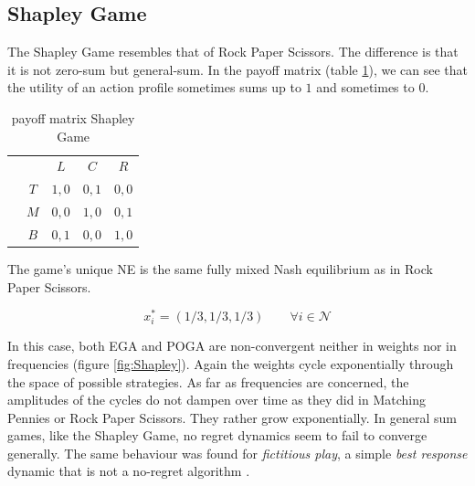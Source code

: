 \subsection{Shapley Game}\label{subsection:shapleyGame}

The Shapley Game \cite{jafari} resembles that of Rock Paper Scissors. The difference is that it is not zero-sum but general-sum. In the payoff matrix (table \ref{tab:payoffShapley}), we can see that the utility of an action profile sometimes sums up to $1$ and sometimes to $0$. 

\begin{table}[H]\centering
\setlength{\extrarowheight}{2pt}
\begin{tabular}{cc|c|c|c|}
  & \multicolumn{1}{c}{} & \multicolumn{1}{c}{$L$}  & \multicolumn{1}{c}{$C$}  & \multicolumn{1}{c}{$R$} \\\cline{3-5}
            & $T$ & $1,0$ & $0,1$ & $0,0$ \\ \cline{3-5}
            & $M$ & $0,0$ & $1,0$ & $0,1$ \\\cline{3-5}
            & $B$ & $0,1$ & $0,0$ & $1,0$ \\\cline{3-5}
\end{tabular}\caption{\label{tab:payoffShapley}payoff matrix Shapley Game}
\end{table}

The game's unique NE is the same fully mixed Nash equilibrium as in Rock Paper Scissors.

\begin{equation*}
    x_{i}^{*} = (1/3,1/3,1/3) \qquad \forall i \in \mathcal{N}
\end{equation*}

In this case, both EGA and POGA are non-convergent neither in weights nor in frequencies (figure \ref{fig:Shapley}). Again the weights cycle exponentially through the space of possible strategies. As far as frequencies are concerned, the amplitudes of the cycles do not dampen over time as they did in Matching Pennies or Rock Paper Scissors. They rather grow exponentially. In general sum games, like the Shapley Game, no regret dynamics seem to fail to converge generally. The same behaviour was found for \textit{fictitious play}, a simple \textit{best response} dynamic that is not a no-regret algorithm \cite{jafari}.


